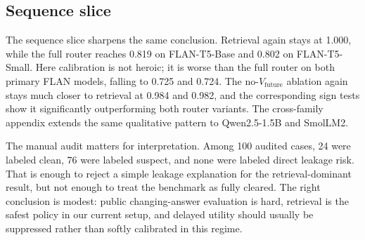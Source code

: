 \clearpage
\subsection{Sequence slice}

\begin{table}[h]
\centering
\small

\caption{Official FreshQA public sequence results on the primary FLAN matrix. On repeated correction chains, suppressing delayed utility is again much safer than the full router, and soft calibration is inconsistent.}
\label{tab:public-freshqa-sequence}
\end{table}

The sequence slice sharpens the same conclusion. Retrieval again stays at 1.000, while the full router reaches 0.819 on FLAN-T5-Base and 0.802 on FLAN-T5-Small. Here calibration is not heroic; it is worse than the full router on both primary FLAN models, falling to 0.725 and 0.724. The no-\(V_{\text{future}}\) ablation again stays much closer to retrieval at 0.984 and 0.982, and the corresponding sign tests show it significantly outperforming both router variants. The cross-family appendix extends the same qualitative pattern to Qwen2.5-1.5B and SmolLM2.

\begin{table}[h]
\centering
\small

\caption{Official FreshQA manual audit summary. The audit found no direct leakage-risk cases, but many cases remain suspect, so the public trust story is bounded rather than fully cleared.}
\label{tab:public-audit}
\end{table}

The manual audit matters for interpretation. Among 100 audited cases, 24 were labeled clean, 76 were labeled suspect, and none were labeled direct leakage risk. That is enough to reject a simple leakage explanation for the retrieval-dominant result, but not enough to treat the benchmark as fully cleared. The right conclusion is modest: public changing-answer evaluation is hard, retrieval is the safest policy in our current setup, and delayed utility should usually be suppressed rather than softly calibrated in this regime.
